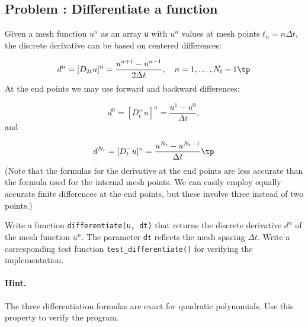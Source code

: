 \documentclass[graybox,sectrefs,envcountresetchap,open=right,final]{svmonodo}
\newenvironment{doconceexercise}{}{}
\newcounter{doconceexercisecounter}
\begin{document}
\begin{doconceexercise}

\subsection*{Problem \thedoconceexercisecounter: Differentiate a function}

\label{decay:exer:dudt}

  

Given a mesh function $u^n$ as an array \texttt{u} with $u^n$ values at mesh
points $t_n=n\Delta t$, the discrete derivative can be based on
centered differences:

\begin{equation}
d^n = [D_{2t}u]^n =
\frac{u^{n+1}-u^{n-1}}{2\Delta t},\quad n=1,\ldots,N_t-1\tp
\label{decay:exer:dudt:D2t}
\end{equation}
At the end points we may use forward and backward differences:

\[ d^0 = [D_t^+u]^n = \frac{u^{1}-u^{0}}{\Delta t},\]
and

\[ d^{N_t} = [D_t^-u]^n = \frac{u^{N_t}-u^{N_t-1}}{\Delta t}\tp\]
(Note that the formulas for the derivative at the end points are
less accurate than the formula used for the internal mesh points.
We can easily employ equally accurate finite differences at the end
points, but these involve three instead of two points.)


Write a function
\texttt{differentiate(u, dt)} that returns the discrete derivative $d^n$ of the
mesh function $u^n$. The parameter \texttt{dt} reflects the
mesh spacing $\Delta t$. Write a corresponding test function
\Verb!test_differentiate()! for verifying the implementation.


\paragraph{Hint.}
The three differentiation formulas are
exact for quadratic polynomials. Use this property to verify the program.





\end{doconceexercise}
\end{document}
